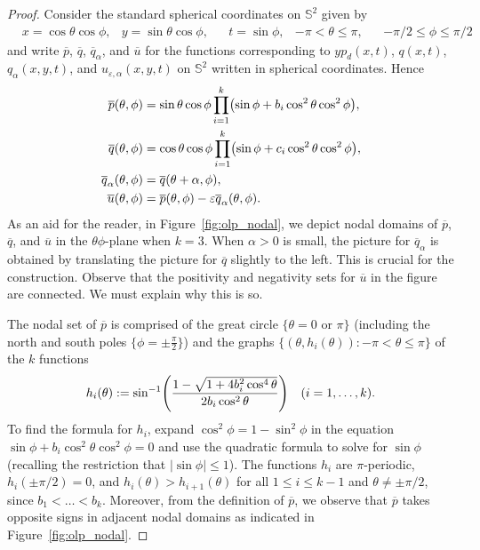 \documentclass[10pt]{amsart}
\theoremstyle{definition}\newtheorem{defi}[theo]{Definition}\newtheorem{rema}[theo]{Remark}\newtheorem{exam}[theo]{Example}\newtheorem{exem}[theo]{Example}\newtheorem{nota}[theo]{Notation}
\newcommand{\sphere}{\mathbb{S}}
\newcommand{\ol}{\overline}
\renewcommand{\epsilon}{\varepsilon}
\let\originalleft\left
\let\originalright\right
\renewcommand{\left}{\mathopen{}\mathclose\bgroup\originalleft}
\renewcommand{\right}{\aftergroup\egroup\originalright}
\begin{document}
\begin{proof}
Consider the standard spherical coordinates on $\sphere^2$ given by
\begin{align}\label{spherical-coordinates}
&x = \cos \theta \cos \phi, &y = \sin \theta \cos \phi,& &t = \sin \phi, &-\pi < \theta \le \pi,& &-\pi/2 \le \phi \le \pi/2
\end{align}
and write $\ol{p}$, $\ol{q}$, $\ol{q}_\alpha$, and $\ol{u}$ for the functions corresponding to $yp_d(x,t)$, $q(x,t)$, $q_\alpha(x,y,t)$, and $u_{\epsilon,\alpha}(x,y,t)$ on $\sphere^2$ written in spherical coordinates. Hence
\begin{equation}\label{ol-defs}
\begin{split}
\ol{p}(\theta,\phi) &= \sin\theta\cos\phi\prod_{i=1}^k\left(\sin\phi + b_i\cos^2\theta\cos^2\phi \right),\\
\ol{q}(\theta,\phi) &= \cos\theta\cos\phi\prod_{i=1}^k\left(\sin\phi + c_i\cos^2\theta\cos^2\phi \right),\\
\ol{q}_\alpha(\theta,\phi) &= \ol{q}(\theta+\alpha,\phi),\\
\ol{u}(\theta,\phi) &= \ol{p}(\theta,\phi)-\epsilon \ol{q}_\alpha(\theta,\phi).
\end{split}
\end{equation}
As an aid for the reader, in Figure~\ref{fig:olp_nodal}, we depict nodal domains of $\ol{p}$, $\ol{q}$, and $\ol{u}$ in the $\theta\phi$-plane when $k=3$. When $\alpha>0$ is small, the picture for $\ol{q}_\alpha$ is obtained by translating the picture for $\ol{q}$ slightly to the left. This is crucial for the construction. Observe that the positivity and negativity sets for $\ol{u}$ in the figure are connected. We must explain why this is so.

The nodal set of $\ol{p}$ is comprised of the great circle $\{\theta=0\text{ or }\pi \}$ (including the north and south poles $\{\phi=\pm\frac{\pi}{2}\}$) and the graphs $\{(\theta,h_i(\theta)):-\pi< \theta\leq \pi\}$ of the $k$ functions
\begin{equation}\label{eqn:yp_soln_i}
h_i(\theta):=\sin^{-1}\left(\frac{1-\sqrt{1+4b_i^2\cos^4\theta}}{2b_i\cos^2\theta}\right)\quad(i=1,\dots,k).
\end{equation}
To find the formula for $h_i$, expand $\cos^2\phi=1-\sin^2\phi$ in the equation $\sin\phi+b_i\cos^2\theta\cos^2\phi=0$ and use the quadratic formula to solve for $\sin\phi$ (recalling the restriction that $|\sin\phi|\leq 1$). The functions $h_i$ are $\pi$-periodic, $h_i(\pm\pi/2)=0$, and $h_i(\theta)>h_{i+1}(\theta)$ for all $1\leq i\leq k-1$ and $\theta\neq\pm \pi/2$, since $b_1<\dots<b_k$. Moreover, from the definition of $\ol{p}$, we observe that $\ol{p}$ takes opposite signs in adjacent nodal domains as indicated in Figure~\ref{fig:olp_nodal}.


\end{proof}
\end{document}
